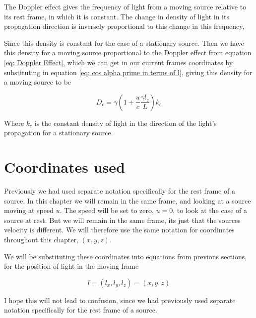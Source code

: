 The Doppler effect gives the frequency of light from a moving source relative to its rest frame, in which it is constant.
The change in density of light in its propagation direction is inversely proportional to this change in this frequency,

Since this density is constant for the case of a stationary source.
Then we have this density for a moving source proportional to the Doppler effect from equation \eqref{eq: Doppler Effect}, which we can get in our current frames coordinates by substituting in equation \eqref{eq: cos alpha prime in terms of l}, giving this density for a moving source to be

\begin{equation}
	\label{eq: denisty of light parallel to propagation}
	D_{c} = {\gamma}\left(1 + \dfrac{u}{c}\frac{\gamma l_z}{L}\right) k_{c}
\end{equation}

Where $k_{c}$ is the constant density of light in the direction of the light's propagation for a stationary source.


\section{Coordinates used}\label{sect: Coordinates used}

Previously we had used separate notation specifically for the rest frame of a source.
In this chapter we will remain in the same frame, and looking at a source moving at speed $u$.
The speed will be set to zero, $u=0$, to look at the case of a source at rest.
But we will remain in the same frame, its just that the sources velocity is different.
We will therefore use the same notation for coordinates throughout this chapter, $(x,y,z)$.

We will be substituting these coordinates into equations from previous sections, for the position of light in the moving frame

\begin{equation}
	\label{eq: position of light}
	\underline{l} = (l_{x},l_{y},l_{z}) = (x,y,z)
\end{equation}

I hope this will not lead to confusion, since we had previously used separate notation specifically for the rest frame of a source.


